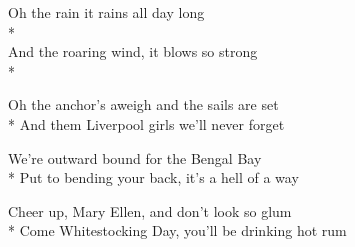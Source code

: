 

\versemark
Oh the rain it rains all day long\\*
\vin{}\\
And the roaring wind, it blows so strong\\*
\vin{}


\versemark
Oh the anchor’s aweigh and the sails are set\etc\\*
And them Liverpool girls we’ll never forget\etcrefrain

\versemark
We’re outward bound for the Bengal Bay\etc\\*
Put to bending your back, it’s a hell of a way\etcrefrain

\versemark
Cheer up, Mary Ellen, and don’t look so glum\etc\\*
Come Whitestocking Day, you’ll be drinking hot rum\etcrefrain


